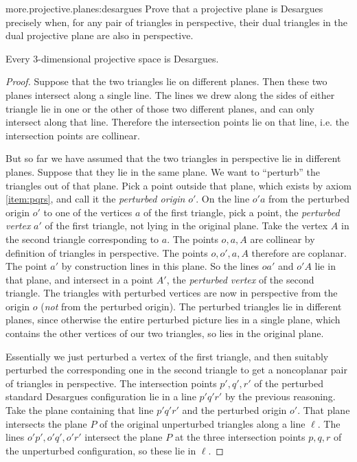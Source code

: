 \begin{problem}{more.projective.planes:desargues}
Prove that a projective plane is Desargues precisely when, for any pair of triangles in perspective, their dual triangles in the dual projective plane are also in perspective.
\end{problem}
 
\begin{lemma}
Every \(3\)-dimensional projective space is Desargues.
\end{lemma}
\begin{center}
\end{center}
\begin{proof}
Suppose that the two triangles lie on different planes.
Then these two planes intersect along a single line.
The lines we drew along the sides of either triangle lie in one or the other of those two different planes, and can only intersect along that line.
Therefore the intersection points lie on that line, i.e. the intersection points are collinear.

But so far we have assumed that the two triangles in perspective lie in different planes.
Suppose that they lie in the same plane.
We want to ``perturb'' the triangles out of that plane.
Pick a point outside that plane, which exists by axiom \ref{item:pqrs}, and call it the \emph{perturbed origin} \(o'\).
On the line \(o'a\) from the perturbed origin \(o'\) to one of the vertices \(a\) of the first triangle, pick a point, the \emph{perturbed vertex} \(a'\) of the first triangle, not lying in the original plane.
Take the vertex \(A\) in the second triangle corresponding to \(a\).
The points \(o, a, A\) are collinear by definition of triangles in perspective.
The points \(o, o', a, A\) therefore are coplanar.
The point \(a'\) by construction lines in this plane.
So the lines \(oa'\) and \(o'A\) lie in that plane, and intersect in a point \(A'\), the \emph{perturbed vertex} of the second triangle.
The triangles with perturbed vertices are now in perspective from the origin \(o\) (\emph{not} from the perturbed origin).
The perturbed triangles lie in different planes, since otherwise the entire perturbed picture lies in a single plane, which contains the other vertices of our two triangles, so lies in the original plane.

Essentially we just perturbed a vertex of the first triangle, and then suitably perturbed the corresponding one in the second triangle to get a noncoplanar pair of triangles in perspective.
The intersection points \(p', q', r'\) of the perturbed standard Desargues configuration lie in a line \(p'q'r'\) by the previous reasoning.
Take the plane containing that line \(p'q'r'\) and the perturbed origin \(o'\).
That plane intersects the plane \(P\) of the original unperturbed triangles along a line \(\ell\).
The lines \(o'p', o'q', o'r'\) intersect the plane \(P\) at the three intersection points \(p, q, r\) of the unperturbed configuration, so these lie in \(\ell\).
\end{proof}

